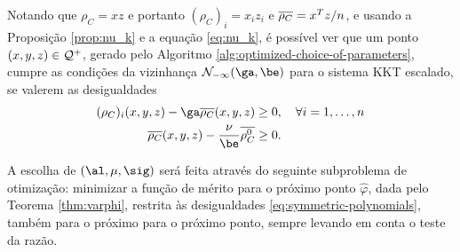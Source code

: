 Notando  que $\rho_C = xz$ e portanto $(\rho_C)_i = x_iz_i$ e
$\overline{\rho_C} = x^Tz/n$, e usando a Proposição \ref{prop:nu_k} e a equação \eqref{eq:nu_k}, é possível ver que um ponto $(x,y,z)\in\mathcal{Q}^+$, gerado pelo Algoritmo 
\ref{alg:optimized-choice-of-parameters}, cumpre as condições da vizinhança
$\Nset_{-\infty}(\ga,\be)$ para o sistema \ac{KKT} escalado, se valerem as  desigualdades 
\begin{subequations}
\label{eq:symmetric-polynomials}
\begin{align} 
  (\rho_C)_i(x,y,z) -  \ga\dbvec{\rho_C}(x,y,z)  & \geq 0, \quad \forall i=1,\ldots,n %
 \label{eq:symmetric-polynomials-b} \\ 
   \dbvec{\rho_C}(x,y,z) - \frac{\nu}{\be} \dbvec{\rho_C^0}  &\geq 0 .
 \label{eq:symmetric-polynomials-a}
\end{align} 
\end{subequations}


A escolha de  $(\al,\mu,\sig)$ será feita através do seguinte subproblema de
otimização: minimizar a função de mérito para o próximo ponto $\hat\varphi$,
dada pelo Teorema \ref{thm:varphi}, restrita às desigualdades \eqref{eq:symmetric-polynomials}, também para o próximo
para o próximo ponto,  sempre  levando em conta o
teste da razão.













